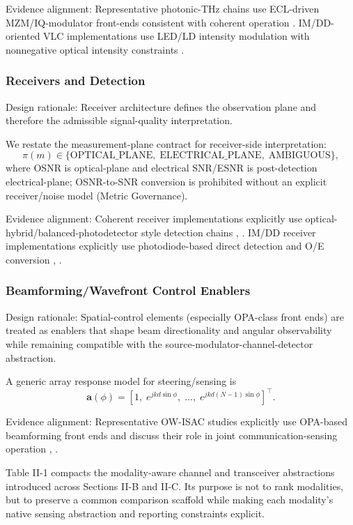 Evidence alignment: Representative photonic-THz chains use ECL-driven MZM/IQ-modulator front-ends consistent with coherent operation \cite{O_ISAC_029}. IM/DD-oriented VLC implementations use LED/LD intensity modulation with nonnegative optical intensity constraints \cite{O_ISAC_001}.

\subsubsection{Receivers and Detection}
Design rationale: Receiver architecture defines the observation plane and therefore the admissible signal-quality interpretation.

We restate the measurement-plane contract for receiver-side interpretation:
\[
\pi(m)\in\{\text{OPTICAL\_PLANE},\;\text{ELECTRICAL\_PLANE},\;\text{AMBIGUOUS}\},
\]
where OSNR is optical-plane and electrical SNR/ESNR is post-detection electrical-plane; OSNR-to-SNR conversion is prohibited without an explicit receiver/noise model (Metric Governance).

Evidence alignment: Coherent receiver implementations explicitly use optical-hybrid/balanced-photodetector style detection chains \cite{O_ISAC_028}, \cite{O_ISAC_029}. IM/DD receiver implementations explicitly use photodiode-based direct detection and O/E conversion \cite{O_ISAC_001}, \cite{O_ISAC_023}.

\subsubsection{Beamforming/Wavefront Control Enablers}
Design rationale: Spatial-control elements (especially OPA-class front ends) are treated as enablers that shape beam directionality and angular observability while remaining compatible with the source-modulator-channel-detector abstraction.

A generic array response model for steering/sensing is
\[
\mathbf{a}(\phi)=\left[1,\;e^{jkd\sin\phi},\;\ldots,\;e^{jkd(N-1)\sin\phi}\right]^{\top}.
\]

Evidence alignment: Representative OW-ISAC studies explicitly use OPA-based beamforming front ends and discuss their role in joint communication-sensing operation \cite{O_ISAC_061}, \cite{O_ISAC_091}.

Table II-1 compacts the modality-aware channel and transceiver abstractions introduced across Sections II-B and II-C. Its purpose is not to rank modalities, but to preserve a common comparison scaffold while making each modality's native sensing abstraction and reporting constraints explicit.

